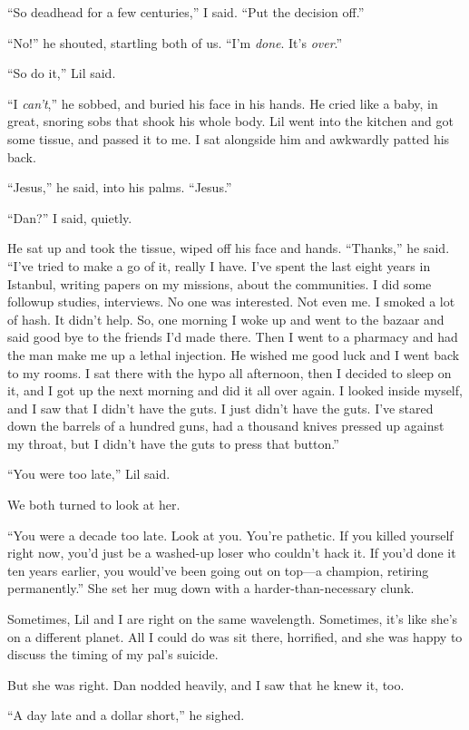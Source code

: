 “So deadhead for a few centuries,” I said. “Put the decision off.”

“No!” he shouted, startling both of us. “I'm \emph{done}. It's
\emph{over}.”

“So do it,” Lil said.

“I \emph{can't},” he sobbed, and buried his face in his hands. He
cried like a baby, in great, snoring sobs that shook his whole
body. Lil went into the kitchen and got some tissue, and passed it
to me. I sat alongside him and awkwardly patted his back.

“Jesus,” he said, into his palms. “Jesus.”

“Dan?” I said, quietly.

He sat up and took the tissue, wiped off his face and hands.
“Thanks,” he said. “I've tried to make a go of it, really I have.
I've spent the last eight years in Istanbul, writing papers on my
missions, about the communities. I did some followup studies,
interviews. No one was interested. Not even me. I smoked a lot of
hash. It didn't help. So, one morning I woke up and went to the
bazaar and said good bye to the friends I'd made there. Then I went
to a pharmacy and had the man make me up a lethal injection. He
wished me good luck and I went back to my rooms. I sat there with
the hypo all afternoon, then I decided to sleep on it, and I got up
the next morning and did it all over again. I looked inside myself,
and I saw that I didn't have the guts. I just didn't have the guts.
I've stared down the barrels of a hundred guns, had a thousand
knives pressed up against my throat, but I didn't have the guts to
press that button.”

“You were too late,” Lil said.

We both turned to look at her.

“You were a decade too late. Look at you. You're pathetic. If you
killed yourself right now, you'd just be a washed-up loser who
couldn't hack it. If you'd done it ten years earlier, you would've
been going out on top—a champion, retiring permanently.” She set
her mug down with a harder-than-necessary clunk.

Sometimes, Lil and I are right on the same wavelength. Sometimes,
it's like she's on a different planet. All I could do was sit
there, horrified, and she was happy to discuss the timing of my
pal's suicide.

But she was right. Dan nodded heavily, and I saw that he knew it,
too.

“A day late and a dollar short,” he sighed.


